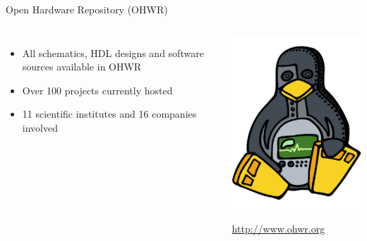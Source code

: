 \documentclass[compress,red]{beamer}
\begin{document}
\begin{frame}{Open Hardware Repository (OHWR)}
  \begin{columns}
    \begin{itemize}
      \item All schematics, HDL designs and software sources available in OHWR
      \item Over 100 projects currently hosted
      \item 11 scientific institutes and 16 companies involved
    \end{itemize}
    \begin{center}
      \includegraphics[width=\textwidth]{ohwr/ohr_logo.pdf}
      \begin{block}{}
        \begin{center}
        \url{http://www.ohwr.org}
        \end{center}
      \end{block}
    \end{center}
  \end{columns}
\end{frame}
\end{document}
